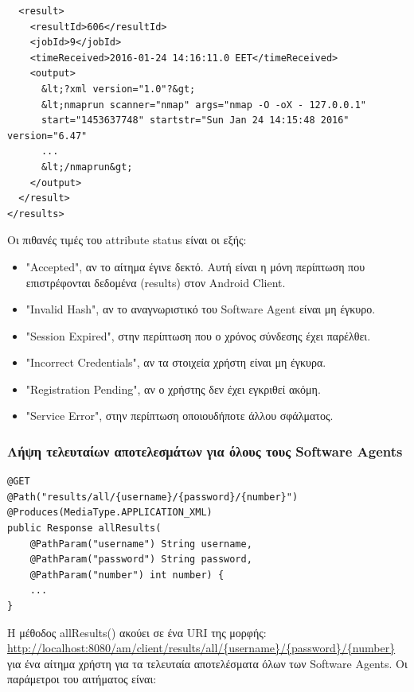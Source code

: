 \documentclass[a4paper,11pt]{article}
\begin{document}
\begin{sloppypar}
\begin{lstlisting}
  <result>
    <resultId>606</resultId>
    <jobId>9</jobId>
    <timeReceived>2016-01-24 14:16:11.0 EET</timeReceived>
    <output>
      &lt;?xml version="1.0"?&gt;
      &lt;nmaprun scanner="nmap" args="nmap -O -oX - 127.0.0.1"
      start="1453637748" startstr="Sun Jan 24 14:15:48 2016" version="6.47"
      ...
      &lt;/nmaprun&gt;
    </output>
  </result>
</results>
\end{lstlisting}
Οι πιθανές τιμές του attribute status είναι οι εξής:
\begin{itemize}
\item "Accepted", αν το αίτημα έγινε δεκτό. Αυτή είναι η μόνη περίπτωση που επιστρέφονται δεδομένα (results) στον Android Client.
\item "Invalid Hash", αν το αναγνωριστικό του Software Agent είναι μη έγκυρο.
\item "Session Expired", στην περίπτωση που ο χρόνος σύνδεσης έχει παρέλθει.
\item "Incorrect Credentials", αν τα στοιχεία χρήστη είναι μη έγκυρα.
\item "Registration Pending", αν ο χρήστης δεν έχει εγκριθεί ακόμη.
\item "Service Error", στην περίπτωση οποιουδήποτε άλλου σφάλματος.
\end{itemize}


\subsubsection{Λήψη τελευταίων αποτελεσμάτων για όλους τους Software Agents}
\begin{lstlisting}
@GET
@Path("results/all/{username}/{password}/{number}")
@Produces(MediaType.APPLICATION_XML)
public Response allResults(
    @PathParam("username") String username,
    @PathParam("password") String password,
    @PathParam("number") int number) {
    ...
}
\end{lstlisting}
Η μέθοδος allResults() ακούει σε ένα URI της μορφής:
\\
\url{http://localhost:8080/am/client/results/all/{username}/{password}/{number}} για ένα αίτημα χρήστη για τα τελευταία αποτελέσματα όλων των Software Agents. Οι παράμετροι του αιτήματος είναι:
\begin{itemize}


\end{itemize}
\end{sloppypar}
\end{document}
